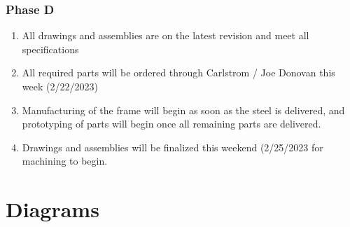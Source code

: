 \documentclass[aspectratio=169]{beamer}
\begin{document}
\begin{frame}
    \frametitle{Phase D}

    \begin{enumerate}
        \item All drawings and assemblies are on the latest revision and meet all specifications
        \item All required parts will be ordered through Carlstrom / Joe Donovan this week (2/22/2023)
        \item Manufacturing of the frame will begin as soon as the steel is delivered, and prototyping of parts will begin once all remaining parts are delivered.
        \item Drawings and assemblies will be finalized this weekend (2/25/2023 for machining to begin.
    \end{enumerate}


\end{frame}


\section{Diagrams}
\end{document}
